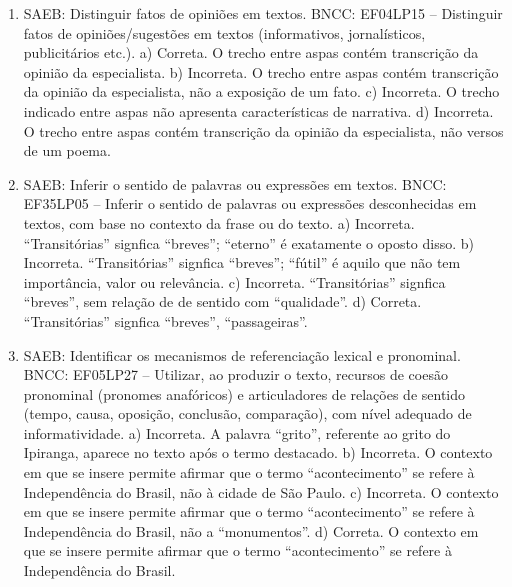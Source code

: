 \begin{enumerate}
\item
SAEB: Distinguir fatos de opiniões em textos. BNCC: EF04LP15 -- Distinguir fatos de opiniões/sugestões em textos (informativos, jornalísticos, publicitários etc.). a) Correta. O trecho entre aspas contém transcrição da opinião da especialista. b) Incorreta. O trecho entre aspas contém transcrição da opinião da especialista, não a exposição de um fato. c) Incorreta. O trecho indicado entre aspas não apresenta características de narrativa. d) Incorreta. O trecho entre aspas contém transcrição da opinião da especialista, não versos de um poema.

\item
SAEB: Inferir o sentido de palavras ou expressões em textos. BNCC: EF35LP05 -- Inferir o sentido de palavras ou expressões desconhecidas em textos, com base no contexto da frase ou do texto. a) Incorreta. ``Transitórias'' signfica ``breves''; ``eterno'' é exatamente o oposto disso. b) Incorreta. ``Transitórias'' signfica ``breves''; ``fútil'' é aquilo que não tem importância, valor ou relevância. c) Incorreta.  ``Transitórias'' signfica ``breves'', sem relação de de sentido com ``qualidade''. d) Correta. ``Transitórias'' signfica ``breves'', ``passageiras''.

\item
SAEB: Identificar os mecanismos de referenciação lexical e pronominal. BNCC: EF05LP27 -- Utilizar, ao produzir o texto, recursos de coesão pronominal (pronomes anafóricos) e articuladores de relações de sentido (tempo, causa, oposição, conclusão, comparação), com nível adequado de informatividade. a) Incorreta. A palavra ``grito'', referente ao grito do Ipiranga, aparece no texto após o termo destacado. b) Incorreta. O contexto em que se insere permite afirmar que o termo ``acontecimento'' se refere à Independência do Brasil, não à cidade de São Paulo. c) Incorreta. O contexto em que se insere permite afirmar que o termo ``acontecimento'' se refere à Independência do Brasil, não a ``monumentos''. d) Correta. O contexto em que se insere permite afirmar que o termo ``acontecimento'' se refere à Independência do Brasil.


\end{enumerate}
